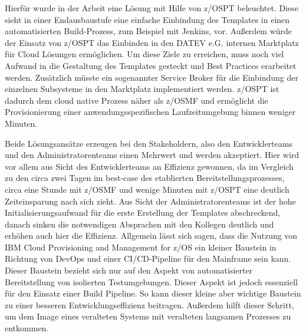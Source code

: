Hierfür wurde in der Arbeit eine Lösung mit Hilfe von z/OSPT beleuchtet.
Diese sieht in einer Endausbaustufe eine einfache Einbindung des Templates in einen automatisierten Build-Prozess, zum Beispiel mit Jenkins, vor.
Außerdem würde der Einsatz von z/OSPT das Einbinden in den DATEV e.G. internen \glqq Marktplatz\grqq{} für Cloud Lösungen ermöglichen.
Um diese Ziele zu erreichen, muss noch viel Aufwand in die Gestaltung des Templates gesteckt und Best Practices erarbeitet werden.
Zusätzlich müsste ein sogenannter \glqq Service Broker\grqq{} für die Einbindung der einzelnen Subsysteme in den \glqq Marktplatz\grqq{} implementiert werden.
z/OSPT ist dadurch dem cloud native Prozess näher als z/OSMF und ermöglicht die Provisionierung einer anwendungsspezifischen Laufzeitumgebung binnen weniger Minuten.

Beide Lösungsansätze erzeugen bei den Stakeholdern, also den Entwicklerteams und den Administratorenteams einen Mehrwert und werden akzeptiert.
Hier wird vor allem aus Sicht des Entwicklerteams an Effizienz gewonnen, da im Vergleich zu den circa zwei Tagen im best-case des etablierten Bereitstellungsprozesses, circa eine Stunde mit z/OSMF und wenige Minuten mit z/OSPT eine deutlich Zeiteinsparung nach sich zieht.
Aus Sicht der Administratorenteams ist der hohe Initialisierungsaufwand für die erste Erstellung der Templates abschreckend, danach sinken die notwendigen Absprachen mit den Kollegen deutlich und erhöhen auch hier die Effizienz.
Allgemein lässt sich sagen, dass die Nutzung von \glqq IBM Cloud Provisioning and Management for z/OS\grqq{} ein kleiner Baustein in Richtung von DevOps und einer CI/CD-Pipeline für den Mainframe sein kann.
Dieser Baustein bezieht sich nur auf den Aspekt von automatisierter Bereitstellung von isolierten Testumgebungen.
Dieser Aspekt ist jedoch essenziell für den Einsatz einer Build Pipeline.
So kann dieser kleine aber wichtige Baustein zu einer besseren Entwicklungseffizienz beitragen.
Außerdem hilft dieser Schritt, um dem Image eines veralteten Systems mit veralteten langsamen Prozesses zu entkommen.

